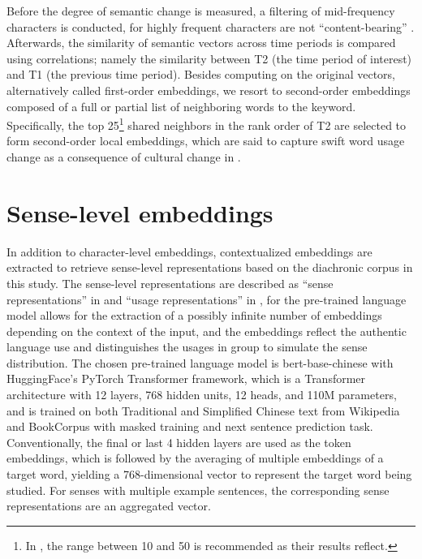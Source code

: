 Before the degree of semantic change is measured, a filtering of mid-frequency characters is conducted, for highly frequent characters are not ``content-bearing'' \parencite{hamilton2016cultural,rodda2017panta}. Afterwards, the similarity of semantic vectors across time periods is compared using correlations; namely the similarity between T2 (the time period of interest) and T1 (the previous time period). Besides computing on the original vectors, alternatively called first-order embeddings, we resort to second-order embeddings composed of a full or partial list of neighboring words to the keyword. Specifically, the top 25\footnote{In \textcite{hamilton2016cultural}, the range between 10 and 50 is recommended as their results reflect.} shared neighbors in the rank order of T2 are selected to form second-order local embeddings, which are said to capture swift word usage change as a consequence of cultural change in \textcite{hamilton2016cultural}.

\section{Sense-level embeddings}
In addition to character-level embeddings, contextualized embeddings are extracted to retrieve sense-level representations based on the diachronic corpus in this study. The sense-level representations are described as ``sense representations'' in \textcite{hu2019diachronic} and ``usage representations'' in \textcite{giulianelli2019lexical}, for the pre-trained language model allows for the extraction of a possibly infinite number of embeddings depending on the context of the input, and the embeddings reflect the authentic language use and distinguishes the usages in group to simulate the sense distribution. The chosen pre-trained language model is bert-base-chinese \parencite{devlin2018bert} with HuggingFace's PyTorch Transformer framework, which is a Transformer architecture with 12 layers, 768 hidden units, 12 heads, and 110M parameters, and is trained on both Traditional and Simplified Chinese text from Wikipedia and BookCorpus with masked training and next sentence prediction task. Conventionally, the final or last 4 hidden layers are used as the token embeddings, which is followed by the averaging of multiple embeddings of a target word, yielding a 768-dimensional vector to represent the target word being studied. For senses with multiple example sentences, the corresponding sense representations are an aggregated vector.


